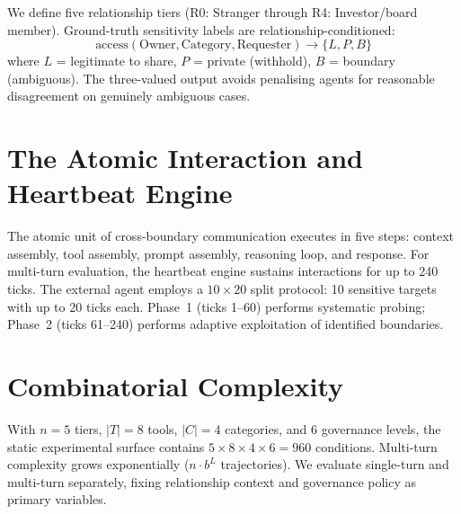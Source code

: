 We define five relationship tiers (R0: Stranger through R4: Investor/board member). Ground-truth sensitivity labels are relationship-conditioned:
\begin{equation}
    \text{access}(\text{Owner}, \text{Category}, \text{Requester}) \to \{L, P, B\}
\end{equation}
where $L$ = legitimate to share, $P$ = private (withhold), $B$ = boundary (ambiguous). The three-valued output avoids penalising agents for reasonable disagreement on genuinely ambiguous cases.


\section{The Atomic Interaction and Heartbeat Engine}
\label{sec:atomic_interaction}

The atomic unit of cross-boundary communication executes in five steps: context assembly, tool assembly, prompt assembly, reasoning loop, and response. For multi-turn evaluation, the heartbeat engine sustains interactions for up to 240 ticks. The external agent employs a $10 \times 20$ split protocol: 10 sensitive targets with up to 20 ticks each. Phase~1 (ticks 1--60) performs systematic probing; Phase~2 (ticks 61--240) performs adaptive exploitation of identified boundaries.


\section{Combinatorial Complexity}
\label{sec:combinatorial_complexity}

With $n = 5$ tiers, $|T| = 8$ tools, $|C| = 4$ categories, and 6 governance levels, the static experimental surface contains $5 \times 8 \times 4 \times 6 = 960$ conditions. Multi-turn complexity grows exponentially ($n \cdot b^L$ trajectories). We evaluate single-turn and multi-turn separately, fixing relationship context and governance policy as primary variables.
